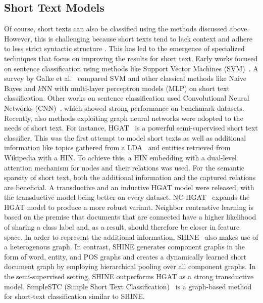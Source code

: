 \documentclass[runningheads]{llncs}
\begin{document}
\subsection{Short Text Models}
\label{rw-short}
Of course, short texts can also be classified using the methods discussed above. 
However, this is challenging because short texts tend to lack context and adhere to less strict syntactic structure \cite{shine}.
This has led to the emergence of specialized techniques that focus on improving the results for short text.
Early works focused on sentence classification using methods like Support Vector Machines (SVM)~\cite{DBLP:journals/air/SilvaCMW11}.
A survey by Galke et al.~\cite{DBLP:conf/kcap/GalkeMSBS17} compared SVM and other classical methods like Naive Bayes and $k$NN with multi-layer perceptron models (MLP) on short text classification.
Other works on sentence classification used Convolutional Neural Networks (CNN)~\cite{wang2021short,DBLP:conf/naacl/ZhangRW16,DBLP:conf/acl/KalchbrennerGB14}, which showed strong performance on benchmark datasets.
Recently, also methods exploiting graph neural networks were adopted to the needs of short text.
For instance, \ac{HGAT}~\cite{hgat} is a powerful semi-supervised short text classifier.
This was the first attempt to model short texts as well as additional information like topics gathered from a \ac{LDA}~\cite{2003LDA} and entities retrieved from Wikipedia with a \ac{HIN}.
To achieve this, a HIN embedding with a dual-level attention mechanism for nodes and their relations was used. For the semantic sparsity of short text, both the additional information and the captured relations are beneficial.
A transductive and an inductive HGAT model were released, with the transductive model being better on every dataset.
NC-HGAT~\cite{nc-hgat} expands the HGAT model to produce a more robust variant.
Neighbor contrastive learning is based on the premise that documents that are connected have a higher likelihood of sharing a class label and, as a result, should therefore be closer in feature space.
In order to represent the additional information, SHINE~\cite{shine} also makes use of a heterogenous graph. In contrast, SHINE generates component graphs in the form of word, entity, and \ac{POS} graphs and creates a dynamically learned short document graph by employing hierarchical pooling over all component graphs. In the semi-supervised setting, SHINE outperforms HGAT as a strong transductive model.
SimpleSTC (Simple Short Text Classification)~\cite{DBLP:conf/emnlp/ZhengWYD22} is a graph-based method for short-text classification similar to SHINE. 
\end{document}
